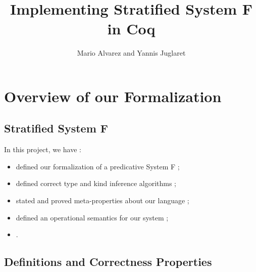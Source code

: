 \documentclass{beamer}
\title{Implementing Stratified System F in Coq}
\author{Mario Alvarez and Yannis Juglaret}
\date{\displaydate{date}}
\begin{document}
\begin{frame}
\titlepage
\end{frame}




\section{Overview of our Formalization}

\subsection{Stratified System F}

\begin{frame}
\end{frame}

\begin{frame}
  In this project, we have :

  \begin{itemize}
    \item defined our formalization of a predicative System F ;
    \item defined correct type and kind inference algorithms ;
    \item stated and proved meta-properties about our language ;
    \item defined an operational semantics for our system ;
    \item . %
  \end{itemize}
\end{frame}

\subsection{Definitions and Correctness Properties}
\end{document}
